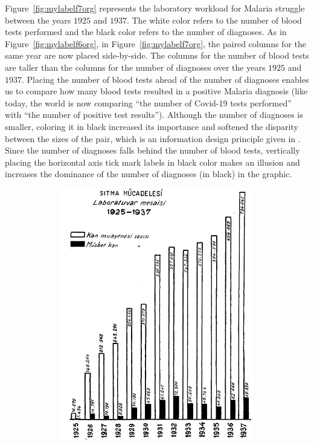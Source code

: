 Figure~\ref{fig:mylabelf7org} represents the laboratory workload for Malaria struggle between the years $1925$ and $1937$. The white color refers to the number of blood tests performed and the black color refers to the number of diagnoses. As in Figure~\ref{fig:mylabelf6org}, in Figure~\ref{fig:mylabelf7org}, the paired columns for the same year are now placed side-by-side. The columns for the number of blood tests are taller than the columns for the number of diagnoses over the years $1925$ and $1937$. Placing the number of blood tests ahead of the number of diagnoses enables us to compare how many blood tests resulted in a positive Malaria diagnosis (like today, the world is now comparing \enquote{the number of Covid-19 tests performed} with \enquote{the number of positive test results}). Although the number of diagnoses is smaller, coloring it in black increased its importance and softened the disparity between the sizes of the pair, which is an information design principle given in \cite{White}. Since the number of diagnoses falls behind the number of blood tests, vertically placing the horizontal axis tick mark labels in black color makes an illusion and increases the dominance of the number of diagnoses (in black) in the graphic. 


\begin{figure}[hbt!]
	\centering
	\includegraphics[width=15cm,height=11cm,keepaspectratio]{Sitma_original.png}
\end{figure}


